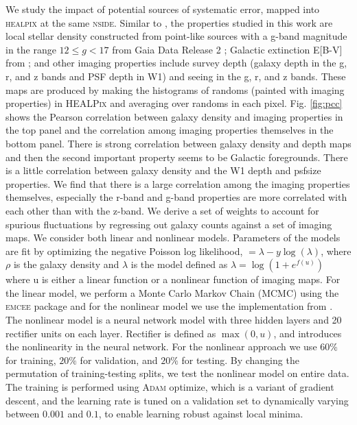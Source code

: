 We study the impact of potential sources of systematic error, mapped into \textsc{healpix} at the same \textsc{nside}. Similar to \cite{zhou2022target}, the properties studied in this work are local stellar density constructed from point-like sources with a g-band magnitude in the range $12 \leq g < 17$ from Gaia Data Release 2 \citep[see,][]{gaiadr2, myers2022};  Galactic extinction E[B-V] from \cite{schlegel1998maps}; and other imaging properties include survey depth (galaxy depth in the g, r, and z bands and PSF depth in W1) and seeing in the g, r, and z bands. These maps are produced by making the histograms of randoms (painted with imaging properties) in \textsc{HEALPix} and averaging over randoms in each pixel. Fig. \ref{fig:pcc} shows the Pearson correlation between galaxy density and imaging properties in the top panel and the correlation among imaging properties themselves in the bottom panel. There is strong correlation between galaxy density and depth maps and then the second important property seems to be Galactic foregrounds. There is a little correlation between galaxy density and the W1 depth and psfsize properties. We find that there is a large correlation among the imaging properties themselves, especially the r-band and g-band properties are more correlated with each other than with the z-band. We derive a set of weights to account for spurious fluctuations by regressing out galaxy counts against a set of imaging maps. We consider both linear and nonlinear models. Parameters of the models are fit by optimizing the negative Poisson log likelihood, $= \lambda - y \log(\lambda)$, where $\rho$ is the galaxy density and $\lambda$ is the model defined as $\lambda = \log (1+e^{f(u)})$ where u is either a linear function or a nonlinear function of imaging maps. For the linear model, we perform a Monte Carlo Markov Chain (MCMC) using the \textsc{emcee} package  and for the nonlinear model we use the implementation from . The nonlinear model is a neural network model with three hidden layers and 20 rectifier units on each layer. Rectifier is defined as  $ \max(0, u)$, and introduces the nonlinearity in the neural network. For the nonlinear approach we use $60\%$ for training, $20\%$ for validation, and $20\%$ for testing. By changing the permutation of training-testing splits, we test the nonlinear model on entire data. The training is performed using \textsc{Adam} optimize, which is a variant of gradient descent, and the learning rate is tuned on a validation set to dynamically varying between $0.001$ and $0.1$, to enable learning robust against local minima.

